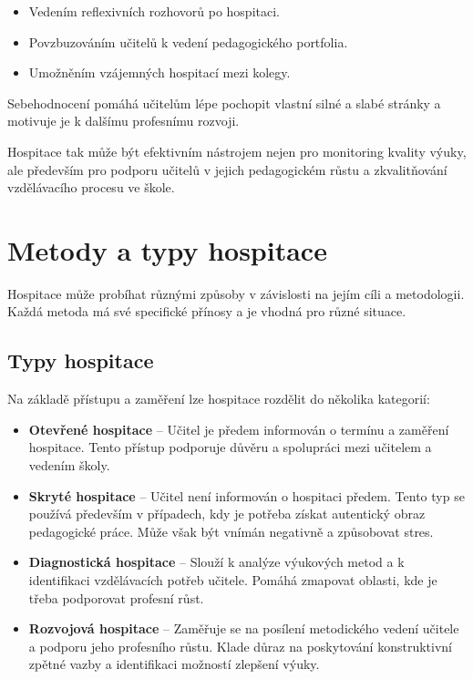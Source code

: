 \begin{itemize}
    \item Vedením reflexivních rozhovorů po hospitaci.
    \item Povzbuzováním učitelů k vedení pedagogického portfolia.
    \item Umožněním vzájemných hospitací mezi kolegy.
\end{itemize}

Sebehodnocení pomáhá učitelům lépe pochopit vlastní silné a slabé stránky a motivuje je k dalšímu profesnímu rozvoji.

Hospitace tak může být efektivním nástrojem nejen pro monitoring kvality výuky, ale především pro podporu učitelů v jejich pedagogickém růstu a zkvalitňování vzdělávacího procesu ve škole.



\section{Metody a typy hospitace}

Hospitace může probíhat různými způsoby v závislosti na jejím cíli a metodologii. Každá metoda má své specifické přínosy a je vhodná pro různé situace.

\subsection{Typy hospitace}

Na základě přístupu a zaměření lze hospitace rozdělit do několika kategorií:

\begin{itemize}
    \item \textbf{Otevřené hospitace} – Učitel je předem informován o termínu a zaměření hospitace. Tento přístup podporuje důvěru a spolupráci mezi učitelem a vedením školy.
    \item \textbf{Skryté hospitace} – Učitel není informován o hospitaci předem. Tento typ se používá především v případech, kdy je potřeba získat autentický obraz pedagogické práce. Může však být vnímán negativně a způsobovat stres.
    \item \textbf{Diagnostická hospitace} – Slouží k analýze výukových metod a k identifikaci vzdělávacích potřeb učitele. Pomáhá zmapovat oblasti, kde je třeba podporovat profesní růst.
    \item \textbf{Rozvojová hospitace} – Zaměřuje se na posílení metodického vedení učitele a podporu jeho profesního růstu. Klade důraz na poskytování konstruktivní zpětné vazby a identifikaci možností zlepšení výuky.
\end{itemize}

